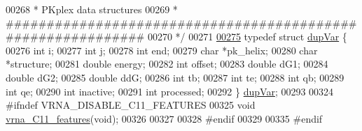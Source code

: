 \begin{DoxyCode}
00268 \textcolor{comment}{ * PKplex data structures}
00269 \textcolor{comment}{ * ############################################################}
00270 \textcolor{comment}{ */}
00271 
\hyperlink{group__data__structures}{00275} \textcolor{keyword}{typedef} \textcolor{keyword}{struct }\hyperlink{group__data__structures_structdupVar}{dupVar} \{
00276   \textcolor{keywordtype}{int}     i;
00277   \textcolor{keywordtype}{int}     j;
00278   \textcolor{keywordtype}{int}     end;
00279   \textcolor{keywordtype}{char}    *pk\_helix;
00280   \textcolor{keywordtype}{char}    *structure;
00281   \textcolor{keywordtype}{double}  energy;
00282   \textcolor{keywordtype}{int}     offset;
00283   \textcolor{keywordtype}{double}  dG1;
00284   \textcolor{keywordtype}{double}  dG2;
00285   \textcolor{keywordtype}{double}  ddG;
00286   \textcolor{keywordtype}{int}     tb;
00287   \textcolor{keywordtype}{int}     te;
00288   \textcolor{keywordtype}{int}     qb;
00289   \textcolor{keywordtype}{int}     qe;
00290   \textcolor{keywordtype}{int}     inactive;
00291   \textcolor{keywordtype}{int}     processed;
00292 \} \hyperlink{group__data__structures_gabd3b93f9aaa9f3acce2d148bae97d24e}{dupVar};
00293 
00324 \textcolor{preprocessor}{#ifndef VRNA\_DISABLE\_C11\_FEATURES}
00325 \textcolor{keywordtype}{void} \hyperlink{group__data__structures_ga21744ae2d6a17309f9327d3547cef0cb}{vrna\_C11\_features}(\textcolor{keywordtype}{void});
00326 
00327 
00328 \textcolor{preprocessor}{#endif}
00329 
00335 \textcolor{preprocessor}{#endif}
\end{DoxyCode}

